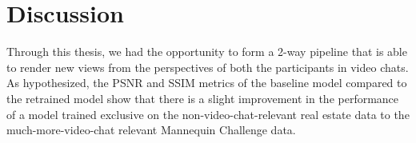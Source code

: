 \chapter{Discussion}\label{ch:discussion}





Through this thesis, we had the opportunity to form a 2-way pipeline that is able to render new views from the perspectives of both the participants in video chats. As hypothesized, the PSNR and SSIM metrics of the baseline model compared to the retrained model show that there is a slight improvement in the performance of a model trained exclusive on the non-video-chat-relevant real estate data to the much-more-video-chat relevant Mannequin Challenge data. 

